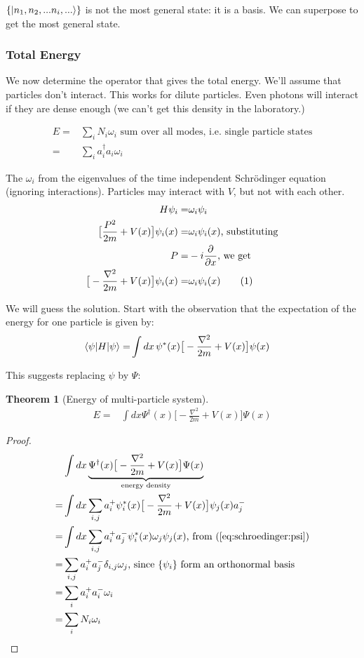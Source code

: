 \documentclass[]{article}
\newcommand\numberthis{\addtocounter{equation}{1}\tag{\theequation}}
\newtheorem{thm}{Theorem}
\begin{document}
$\{\ket{n_1,n_2,...n_i,...}\}$ is not the most general state: it is a basis. We can superpose to get the most general state.


\subsubsection{Total Energy}
We now determine the operator that gives the total energy. We'll assume that particles don't interact. This works for dilute particles. Even photons will interact if they are dense enough (we can't get this density in the laboratory.)

\begin{align*}
	E =& \sum_{i} N_i \omega_i \text{ sum over all modes, i.e. single particle states}\\
	=& \sum_{i} a^\dagger_i a_i \omega_i
\end{align*}

The $\omega_i$ from the eigenvalues of the time independent Schr\"odinger equation (ignoring interactions). Particles may interact with $V$, but not with each other.
\begin{align*}
	H \psi_i =& \omega_i \psi_i\\
	\big[\frac{P^2}{2m} + V(x)\big]\psi_i(x)=& \omega_i \psi_i(x) \text{, substituting}\\
	P =& -i \frac{\partial}{\partial x} \text{, we get}\\
	\big[-\frac{\nabla^2}{2m} + V(x)\big]\psi_i(x)=& \omega_i \psi_i(x) \numberthis \label{eq:schroedinger:psi}
\end{align*}

We will guess the solution. Start with the observation that the expectation of the energy for one particle is given by:
\begin{align*}
	\braket{\psi | H | \psi} =&\int dx \, \psi^*(x) \big[-\frac{\nabla^2}{2m} + V(x)\big]\psi(x)
\end{align*}

This suggests replacing $\psi$ by $\Psi$:
\begin{thm}[Energy of multi-particle system]
	\begin{align*}
		E=&\int dx \Psi^\dagger(x) \big[-\frac{\nabla^2}{2m} + V(x)\big] \Psi(x)
	\end{align*}
\end{thm}

\begin{proof}
	\begin{align*}
		&\int dx \underbrace{\Psi^\dagger(x) \big[-\frac{\nabla^2}{2m} + V(x)\big] \Psi(x)}_\text{energy density} \\
		=& \int dx \sum_{i,j}a^+_i\psi_i^*(x)\big[-\frac{\nabla^2}{2m} + V(x)\big]\psi_j(x)a^-_j\\
		=& \int dx \sum_{i,j} a^+_i a^-_j \psi_i^*(x) \omega_j \psi_j(x) \text{, from (\ref{eq:schroedinger:psi})}\\
		=& \sum_{i,j} a^+_i a^-_j \delta_{i,j} \omega_j \text{, since $\{\psi_i\}$ form an orthonormal basis} \\
		=& \sum_{i} a^+_i a^-_i  \omega_i\\
		=& \sum_i N_i \omega_i
	\end{align*}
\end{proof}
\end{document}
